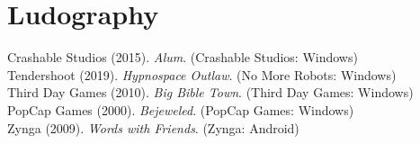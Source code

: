\section{Ludography}
Crashable Studios (2015). \textit{Alum}. (Crashable Studios: Windows)\\
Tendershoot (2019). \textit{Hypnospace Outlaw}. (No More Robots: Windows)\\
Third Day Games (2010). \textit{Big Bible Town}. (Third Day Games: Windows)\\
PopCap Games (2000). \textit{Bejeweled}. (PopCap Games: Windows)\\
Zynga (2009). \textit{Words with Friends}. (Zynga: Android)